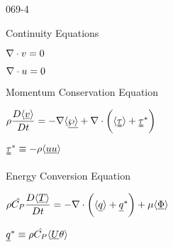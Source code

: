 \begin{mitframe}{069-4}

\begin{listone}

	\item Continuity Equations
	
    \begin{listtwo}
       
       \item $\nabla\cdot\vvel=0$
       
       \item $\nabla\cdot\forcepot=0$
  
	\end{listtwo}

	\item Momentum Conservation Equation

	\begin{listtwo}
          
    	\item $\dens\dfrac{\elecdisplace\langle\uline{\vvel}\rangle}{\elecdisplace{t}}=-\nabla\langle\uline{\dynpress\rangle}+\nabla\cdot\bigg(\langle\uuline{\torque}\rangle+\uuline{\torque}^*\bigg)$
							
		\begin{listthree}
                            
        	\item $\uuline{\torque}^*\equiv-\dens\langle\uline{\forcepot}\uline{\forcepot}\rangle$
                            
		\end{listthree}
		
	\end{listtwo}

	\item Energy Conversion Equation

	\begin{listtwo}
		\item $\dens\hat{\cp}\dfrac{\elecdisplace\langle\uline\Temp\rangle}{\elecdisplace{t}}=-\nabla\cdot\bigg(\langle\uline{\heatflux}\rangle+\uline{\heatflux}^*\bigg)+\chempot\langle\uline\diss\rangle$
            
		\begin{listthree}
                    
        	\item $\uline{\heatflux}^*\equiv\dens\hat{\cp}\langle\uline{\uvel}\theta\rangle$
                   

\end{listthree}
\end{listtwo}
\end{listone}
\end{mitframe}
